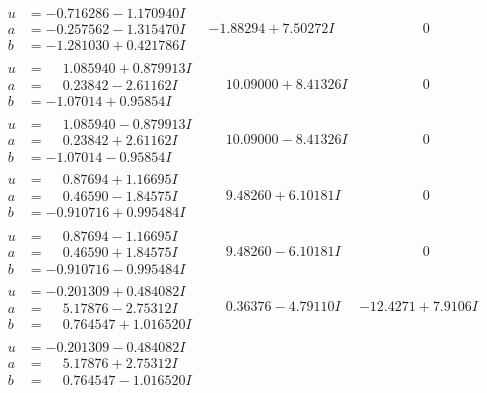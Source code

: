 \documentclass[1p]{elsarticle_modified}
\theoremstyle{definition}
\begin{document}
$$\begin{array}{c|c|c}
\begin{aligned}
u &= -0.716286 - 1.170940 I \\
a &= -0.257562 - 1.315470 I \\
b &= -1.281030 + 0.421786 I\end{aligned}
 & -1.88294 + 7.50272 I & \phantom{-0.000000 } 0 \\ \hline\begin{aligned}
u &= \phantom{-}1.085940 + 0.879913 I \\
a &= \phantom{-}0.23842 - 2.61162 I \\
b &= -1.07014 + 0.95854 I\end{aligned}
 & \phantom{-}10.09000 + 8.41326 I & \phantom{-0.000000 } 0 \\ \hline\begin{aligned}
u &= \phantom{-}1.085940 - 0.879913 I \\
a &= \phantom{-}0.23842 + 2.61162 I \\
b &= -1.07014 - 0.95854 I\end{aligned}
 & \phantom{-}10.09000 - 8.41326 I & \phantom{-0.000000 } 0 \\ \hline\begin{aligned}
u &= \phantom{-}0.87694 + 1.16695 I \\
a &= \phantom{-}0.46590 - 1.84575 I \\
b &= -0.910716 + 0.995484 I\end{aligned}
 & \phantom{-}9.48260 + 6.10181 I & \phantom{-0.000000 } 0 \\ \hline\begin{aligned}
u &= \phantom{-}0.87694 - 1.16695 I \\
a &= \phantom{-}0.46590 + 1.84575 I \\
b &= -0.910716 - 0.995484 I\end{aligned}
 & \phantom{-}9.48260 - 6.10181 I & \phantom{-0.000000 } 0 \\ \hline\begin{aligned}
u &= -0.201309 + 0.484082 I \\
a &= \phantom{-}5.17876 - 2.75312 I \\
b &= \phantom{-}0.764547 + 1.016520 I\end{aligned}
 & \phantom{-}0.36376 - 4.79110 I & -12.4271 + 7.9106 I \\ \hline\begin{aligned}
u &= -0.201309 - 0.484082 I \\
a &= \phantom{-}5.17876 + 2.75312 I \\
b &= \phantom{-}0.764547 - 1.016520 I\end{aligned}

\end{array}$$
\end{document}
